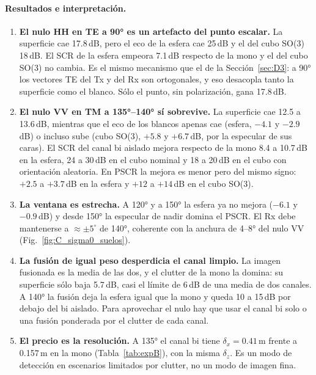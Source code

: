 \paragraph{Resultados e interpretación.}
\begin{enumerate}[itemsep=3pt]
  \item \textbf{El nulo HH en TE a 90° es un artefacto del punto escalar.} La superficie cae
  17.8\,dB, pero el eco de la esfera cae 25\,dB y el del cubo SO(3) 18\,dB. El SCR de la esfera
  empeora 7.1\,dB respecto de la mono y el del cubo SO(3) no cambia. Es el mismo mecanismo que el
  de la Sección~\ref{sec:D3}: a 90° los vectores TE del Tx y del Rx son ortogonales, y eso
  desacopla tanto la superficie como el blanco. Sólo el punto, sin polarización, gana 17.8\,dB.
  \item \textbf{El nulo VV en TM a 135°--140° sí sobrevive.} La superficie cae 12.5 a 13.6\,dB,
  mientras que el eco de los blancos apenas cae (esfera, $-4.1$ y $-2.9$\,dB) o incluso sube
  (cubo SO(3), $+5.8$ y $+6.7$\,dB, por la especular de sus caras). El SCR del canal bi aislado
  mejora respecto de la mono 8.4 a 10.7\,dB en la esfera, 24 a 30\,dB en el cubo nominal y 18 a
  20\,dB en el cubo con orientación aleatoria. En PSCR la mejora es menor pero del mismo signo:
  $+2.5$ a $+3.7$\,dB en la esfera y $+12$ a $+14$\,dB en el cubo SO(3).
  \item \textbf{La ventana es estrecha.} A 120° y a 150° la esfera ya no mejora ($-6.1$ y
  $-0.9$\,dB) y desde 150° la especular de nadir domina el PSCR. El Rx debe mantenerse a
  $\approx\pm5^{\circ}$ de 140°, coherente con la anchura de 4--8° del nulo VV
  (Fig.~\ref{fig:C_sigma0_suelos}).
  \item \textbf{La fusión de igual peso desperdicia el canal limpio.} La imagen fusionada es la
  media de las dos, y el clutter de la mono la domina: su superficie sólo baja 5.7\,dB, casi el
  límite de 6\,dB de una media de dos canales. A 140° la fusión deja la esfera igual que la mono y
  queda 10 a 15\,dB por debajo del bi aislado. Para aprovechar el nulo hay que usar el canal bi
  solo o una fusión ponderada por el clutter de cada canal.
  \item \textbf{El precio es la resolución.} A 135° el canal bi tiene $\delta_x=0.41$\,m frente a
  0.157\,m en la mono (Tabla~\ref{tab:expB}), con la misma $\delta_z$. Es un modo de detección
  en escenarios limitados por clutter, no un modo de imagen fina.
\end{enumerate}


